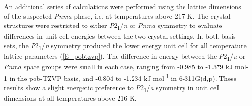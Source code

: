 An additional series of calculations were performed using the lattice dimensions of the suspected \textit{Pnma} phase, i.e. at temperatures above 217 K. The crystal structures were restricted to either \textit{P}2\textsubscript{1}/\textit{n} or \textit{Pnma} symmetry to evaluate differences in unit cell energies between the two crystal settings. In both basis sets, the \textit{P}2\textsubscript{1}/\textit{n}  symmetry produced the lower energy unit cell for all temperature lattice parameters (\autoref{E_pobtzvp}). The difference in energy between the \textit{P}2\textsubscript{1}/\textit{n} or \textit{Pnma} space groups were small in each case, ranging from -0.985 to -1.379 kJ mol-1 in the pob-TZVP basis, and -0.804 to -1.234 kJ mol\textsuperscript{-1} in 6-311G(d,p). These results show a slight energetic preference to \textit{P}2\textsubscript{1}/\textit{n} symmetry in unit cell dimensions at all temperatures above 216 K.

